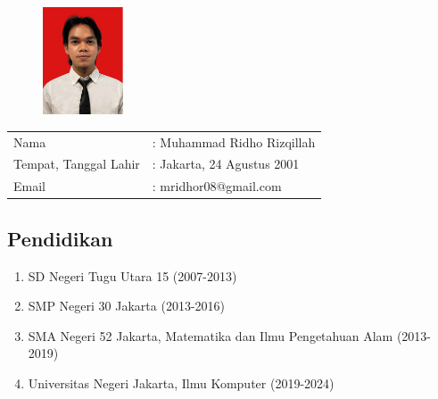 \chapter*{}

\begin{figure}[H]
\centering
\includegraphics[height={120px}, width={90px}]{gambar/pas_foto/ridho}
\end{figure}

\noindent
\begin{tabular}{ll}
Nama & : Muhammad Ridho Rizqillah \\
Tempat, Tanggal Lahir & : Jakarta, 24 Agustus 2001 \\
Email & : mridhor08@gmail.com
\end{tabular}

\section*{Pendidikan}
\begin{enumerate}
    \itemsep0em 
    \item SD Negeri Tugu Utara 15 (2007-2013)
    \item SMP Negeri 30 Jakarta (2013-2016)
    \item SMA Negeri 52 Jakarta, Matematika dan Ilmu Pengetahuan Alam (2013-2019)
    \item Universitas Negeri Jakarta, Ilmu Komputer (2019-2024)
\end{enumerate}

